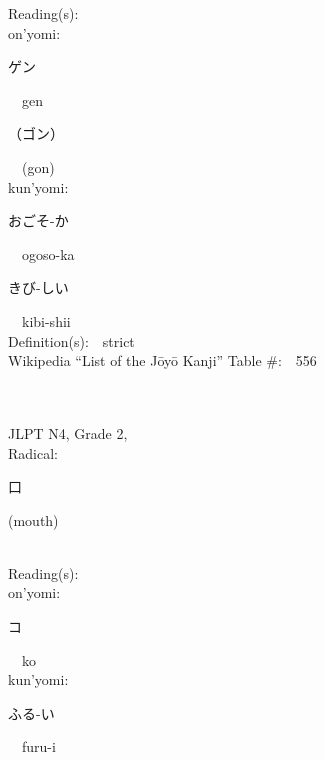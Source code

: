 \begin{multicols}{2}
Reading(s):\ \ \\
{\hspace*{1em}}on'yomi:\ \ \\
{\hspace*{2em}}{\begin{CJK}{UTF8}{min} ゲン \end{CJK}}\ \ gen\ \ \\
{\hspace*{2em}}{\begin{CJK}{UTF8}{min} （ゴン） \end{CJK}}\ \ (gon)\ \ \\
{\hspace*{1em}}kun'yomi:\ \ \\
{\hspace*{2em}}{\begin{CJK}{UTF8}{min} おごそ-か \end{CJK}}\ \ ogoso-ka\ \ \\
{\hspace*{2em}}{\begin{CJK}{UTF8}{min} きび-しい \end{CJK}}\ \ kibi-shii\ \ \\
Definition(s):\ \ strict \\
Wikipedia ``List of the J\=oy\=o Kanji'' Table \#:\ \ 556 \\
\ \ \\
{\fontsize{34pt}{40pt}  }\ \ \\  %
{JLPT N4, Grade 2, \\Radical:\ \ {\begin{CJK}{UTF8}{min} 口 \end{CJK}} (mouth) } \\
Reading(s):\ \ \\
{\hspace*{1em}}on'yomi:\ \ \\
{\hspace*{2em}}{\begin{CJK}{UTF8}{min} コ \end{CJK}}\ \ ko\ \ \\
{\hspace*{1em}}kun'yomi:\ \ \\
{\hspace*{2em}}{\begin{CJK}{UTF8}{min} ふる-い \end{CJK}}\ \ furu-i\ \ \\

\end{multicols}
